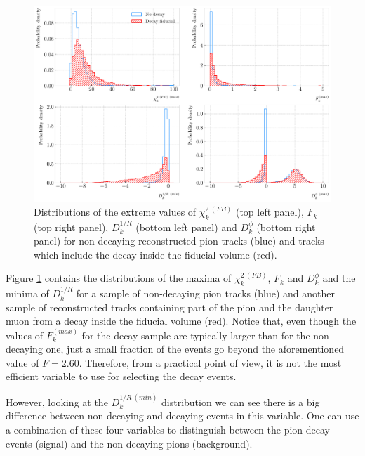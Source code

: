 \begin{figure}[t]
	\centering
	\includegraphics[width=.85\linewidth]{Images/GArSoft_PID/pion_decay/pion_decay_variables.pdf}
	\caption{Distributions of the extreme values of $\chi^{2 \ (FB)}_{k}$ (top left panel), $F_{k}$ (top right panel), $D^{1/R}_{k}$ (bottom left panel) and $D^{\phi}_{k}$ (bottom right panel) for non-decaying reconstructed pion tracks (blue) and tracks which include the decay inside the fiducial volume (red).}
	\label{fig:breakpoint_variables}
\end{figure}

Figure \ref{fig:breakpoint_variables} contains the distributions of the maxima of $\chi^{2 \ (FB)}_{k}$, $F_{k}$ and $D^{\phi}_{k}$ and the minima of $D^{1/R}_{k}$ for a sample of non-decaying pion tracks (blue) and another sample of reconstructed tracks containing part of the pion and the daughter muon from a decay inside the fiducial volume (red). Notice that, even though the values of $F^{(max)}_{k}$ for the decay sample are typically larger than for the non-decaying one, just a small fraction of the events go beyond the aforementioned value of $F=2.60$. Therefore, from a practical point of view, it is not the most efficient variable to use for selecting the decay events.

However, looking at the $D^{1/R \ (min)}_{k}$ distribution we can see there is a big difference between non-decaying and decaying events in this variable. One can use a combination of these four variables to distinguish between the pion decay events (signal) and the non-decaying pions (background).

